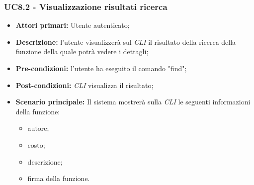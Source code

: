 \subsubsection{UC8.2 - Visualizzazione risultati ricerca}
\begin{itemize}
	\item \textbf{Attori primari:} Utente autenticato;
	\item \textbf{Descrizione:} l'utente visualizzerà sul \textit{CLI\glo} il risultato della ricerca della funzione della quale potrà vedere i dettagli;
	\item \textbf{Pre-condizioni:} l'utente ha eseguito il comando "find";
	\item \textbf{Post-condizioni:} \textit{CLI\glo} visualizza il risultato;
	\item \textbf{Scenario principale:} Il sistema mostrerà sulla \textit{CLI\glo} le seguenti informazioni della funzione:
    		\begin{itemize}
    			\item autore;
    			\item costo;
    			\item descrizione;
    			\item firma della funzione.
    		\end{itemize}
\end{itemize}
